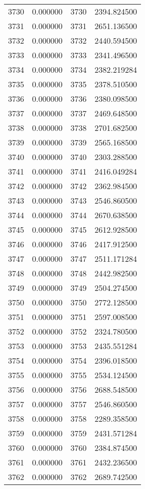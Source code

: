 \documentclass[12pt]{article}
\begin{document}
\begin{longtable}{@{}cccc@{}}
3730 & 0.000000 & 3730 & 2394.824500 \\
3731 & 0.000000 & 3731 & 2651.136500 \\
3732 & 0.000000 & 3732 & 2440.594500 \\
3733 & 0.000000 & 3733 & 2341.496500 \\
3734 & 0.000000 & 3734 & 2382.219284 \\
3735 & 0.000000 & 3735 & 2378.510500 \\
3736 & 0.000000 & 3736 & 2380.098500 \\
3737 & 0.000000 & 3737 & 2469.648500 \\
3738 & 0.000000 & 3738 & 2701.682500 \\
3739 & 0.000000 & 3739 & 2565.168500 \\
3740 & 0.000000 & 3740 & 2303.288500 \\
3741 & 0.000000 & 3741 & 2416.049284 \\
3742 & 0.000000 & 3742 & 2362.984500 \\
3743 & 0.000000 & 3743 & 2546.860500 \\
3744 & 0.000000 & 3744 & 2670.638500 \\
3745 & 0.000000 & 3745 & 2612.928500 \\
3746 & 0.000000 & 3746 & 2417.912500 \\
3747 & 0.000000 & 3747 & 2511.171284 \\
3748 & 0.000000 & 3748 & 2442.982500 \\
3749 & 0.000000 & 3749 & 2504.274500 \\
3750 & 0.000000 & 3750 & 2772.128500 \\
3751 & 0.000000 & 3751 & 2597.008500 \\
3752 & 0.000000 & 3752 & 2324.780500 \\
3753 & 0.000000 & 3753 & 2435.551284 \\
3754 & 0.000000 & 3754 & 2396.018500 \\
3755 & 0.000000 & 3755 & 2534.124500 \\
3756 & 0.000000 & 3756 & 2688.548500 \\
3757 & 0.000000 & 3757 & 2546.860500 \\
3758 & 0.000000 & 3758 & 2289.358500 \\
3759 & 0.000000 & 3759 & 2431.571284 \\
3760 & 0.000000 & 3760 & 2384.874500 \\
3761 & 0.000000 & 3761 & 2432.236500 \\
3762 & 0.000000 & 3762 & 2689.742500 \\

\end{longtable}
\end{document}
